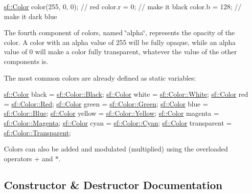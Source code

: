 \begin{DoxyCode}
\hyperlink{classsf_1_1_color}{sf::Color} color(255, 0, 0); \textcolor{comment}{// red}
color.r = 0;                \textcolor{comment}{// make it black}
color.b = 128;              \textcolor{comment}{// make it dark blue}
\end{DoxyCode}


The fourth component of colors, named \char`\"{}alpha\char`\"{}, represents the opacity of the color. A color with an alpha value of 255 will be fully opaque, while an alpha value of 0 will make a color fully transparent, whatever the value of the other components is.

The most common colors are already defined as static variables\+: 
\begin{DoxyCode}
\hyperlink{classsf_1_1_color}{sf::Color} black       = \hyperlink{classsf_1_1_color_a77c688197b981338f0b19dc58bd2facd}{sf::Color::Black};
\hyperlink{classsf_1_1_color}{sf::Color} white       = \hyperlink{classsf_1_1_color_a4fd874712178d9e206f53226002aa4ca}{sf::Color::White};
\hyperlink{classsf_1_1_color}{sf::Color} red         = \hyperlink{classsf_1_1_color_a127dbf55db9c07d0fa8f4bfcbb97594a}{sf::Color::Red};
\hyperlink{classsf_1_1_color}{sf::Color} green       = \hyperlink{classsf_1_1_color_a95629b30de8c6856aa7d3afed12eb865}{sf::Color::Green};
\hyperlink{classsf_1_1_color}{sf::Color} blue        = \hyperlink{classsf_1_1_color_ab03770d4817426b2614cfc33cf0e245c}{sf::Color::Blue};
\hyperlink{classsf_1_1_color}{sf::Color} yellow      = \hyperlink{classsf_1_1_color_af8896b5f56650935f5b9d72d528802c7}{sf::Color::Yellow};
\hyperlink{classsf_1_1_color}{sf::Color} magenta     = \hyperlink{classsf_1_1_color_a6fe70d90b65b2163dd066a84ac00426c}{sf::Color::Magenta};
\hyperlink{classsf_1_1_color}{sf::Color} cyan        = \hyperlink{classsf_1_1_color_a64ae9beb0b9a5865dd811cda4bb18340}{sf::Color::Cyan};
\hyperlink{classsf_1_1_color}{sf::Color} transparent = \hyperlink{classsf_1_1_color_a569b45471737f770656f50ae7bbac292}{sf::Color::Transparent};
\end{DoxyCode}


Colors can also be added and modulated (multiplied) using the overloaded operators + and $\ast$. 

\subsection{Constructor \& Destructor Documentation}
\mbox{\label{classsf_1_1_color_ac2eb4393fb11ad3fa3ccf34e92fe08e4}} 
